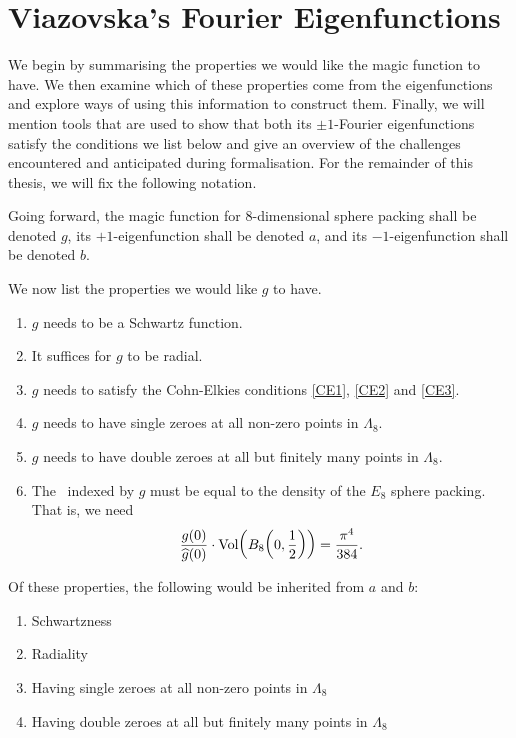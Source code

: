 \section{Viazovska's Fourier Eigenfunctions}

We begin by summarising the properties we would like the magic function to have. We then examine which of these properties come from the eigenfunctions and explore ways of using this information to construct them. Finally, we will mention tools that are used to show that both its $\pm 1$-Fourier eigenfunctions satisfy the conditions we list below and give an overview of the challenges encountered and anticipated during formalisation. For the remainder of this thesis, we will fix the following notation.

\begin{boxnotation}
    Going forward, the magic function for $8$-dimensional sphere packing shall be denoted $g$, its $+1$-eigenfunction shall be denoted $a$, and its $-1$-eigenfunction shall be denoted $b$.
\end{boxnotation}

We now list the properties we would like $g$ to have.

\begin{enumerate}
    \item $g$ needs to be a Schwartz function.
    \item It suffices for $g$ to be radial.
    \item $g$ needs to satisfy the Cohn-Elkies conditions \ref{CE1}, \ref{CE2} and \ref{CE3}.
    \item $g$ needs to have single zeroes at all non-zero points in $\Lambda_8$.
    \item $g$ needs to have double zeroes at all but finitely many points in $\Lambda_8$.
    \item The \CELP\ indexed by $g$ must be equal to the density of the $E_8$ sphere packing. That is, we need
    \begin{align*}
        \frac{g(0)}{\widehat{g}(0)} \cdot \operatorname{Vol}\!\left( B_8\!\left( 0, \frac{1}{2} \right) \right) = \frac{\pi^4}{384}.
    \end{align*}
\end{enumerate}

Of these properties, the following would be inherited from $a$ and $b$:

\begin{enumerate}
    \item Schwartzness
    \item Radiality
    \item Having single zeroes at all non-zero points in $\Lambda_8$
    \item Having double zeroes at all but finitely many points in $\Lambda_8$
\end{enumerate}

